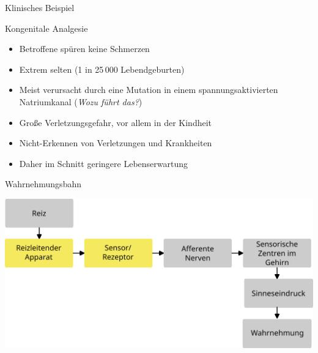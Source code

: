 \documentclass{beamer}
\begin{document}
\begin{frame}{Klinisches Beispiel}

\begin{block}{Kongenitale Analgesie}
\begin{itemize}
\item
Betroffene spüren keine Schmerzen
    \item 
    Extrem selten (1 in 25\,000 Lebendgeburten)
    \item
    Meist verursacht durch eine Mutation in einem spannungsaktivierten Natriumkanal (\emph{Wozu führt das?})
    \item
    Große Verletzungsgefahr, vor allem in der Kindheit 
    \item
    Nicht-Erkennen von Verletzungen und Krankheiten 
    \item
    Daher im Schnitt geringere Lebenserwartung

\end{itemize}
\end{block}


\end{frame}


\begin{frame}{Wahrnehmungsbahn}
    
    \begin{center}
        \includegraphics[width=\textwidth]{wahrnehmungsprozess_ohne_beispiel_apparat_und_sensor.png}
    
    \end{center}
    
\end{frame}
\end{document}
